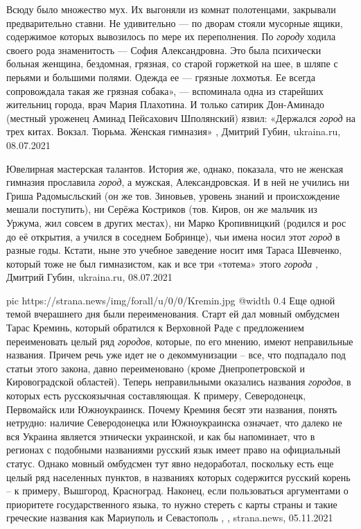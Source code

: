 Всюду было множество мух. Их выгоняли из комнат полотенцами, закрывали
предварительно ставни. Не удивительно — по дворам стояли мусорные ящики,
содержимое которых вывозилось по мере их переполнения.  По \emph{городу} ходила своего
рода знаменитость — София Александровна. Это была психически больная женщина,
бездомная, грязная, со старой горжеткой на шее, в шляпе с перьями и большими
полями. Одежда ее — грязные лохмотья. Ее всегда сопровождала такая же грязная
собака», — вспоминала одна из старейших жительниц города, врач Мария Плахотина.
И только сатирик Дон-Аминадо (местный уроженец Аминад Пейсахович Шполянский)
язвил: «Держался \emph{город} на трех китах. Вокзал. Тюрьма. Женская гимназия»
, Дмитрий Губин, ukraina.ru, 08.07.2021

Ювелирная мастерская талантов.
История же, однако, показала, что не женская гимназия прославила \emph{город}, а
мужская, Александровская. И в ней не учились ни Гриша Радомысльский (он же тов.
Зиновьев, уровень знаний и происхождение мешали поступить), ни Серёжа Костриков
(тов. Киров, он же мальчик из Уржума, жил совсем в других местах), ни Марко
Кропивницкий (родился и рос до её открытия, а учился в соседнем Бобринце), чьи
имена носил этот \emph{город} в разные годы. Кстати, ныне это учебное заведение носит
имя Тараса Шевченко, который тоже не был гимназистом, как и все три «тотема»
этого \emph{города}
, Дмитрий Губин, ukraina.ru, 08.07.2021

\ifcmt
  pic https://strana.news/img/forall/u/0/0/Kremin.jpg
  @width 0.4
\fi
Еще одной темой вчерашнего дня были переименования. Старт ей дал мовный
омбудсмен Тарас Креминь, который обратился к Верховной Раде с предложением
переименовать целый ряд \emph{городов}, которые, по его мнению, имеют неправильные
названия.  Причем речь уже идет не о декоммунизации – все, что подпадало под
статьи этого закона, давно переименовано (кроме Днепропетровской и
Кировоградской областей).  Теперь неправильными оказались названия \emph{городов}, в
которых есть русскоязычная составляющая. К примеру, Северодонецк, Первомайск
или Южноукраинск.  Почему Креминя бесят эти названия, понять нетрудно: наличие
Северодонецка или Южноукраинска означает, что далеко не вся Украина является
этнически украинской, и как бы напоминает, что в регионах с подобными
названиями русский язык имеет право на официальный статус.  Однако мовный
омбудсмен тут явно недоработал, поскольку есть еще целый ряд населенных
пунктов, в названиях которых содержится русский корень – к примеру, Вышгород,
Красноград.  Наконец, если пользоваться аргументами о приоритете
государственного языка, то нужно стереть с карты страны и такие греческие
названия как Мариуполь и Севастополь
, 
, strana.news, 05.11.2021

